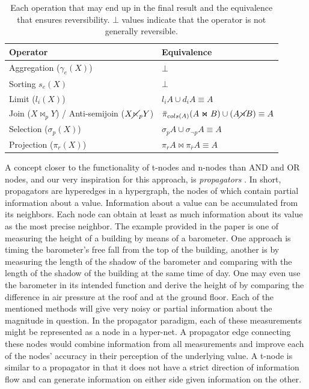 \begin{table}[H]
  \centering
  \begin{tabular}{ll}
    Operator & Equivalence\\
    \hline
    Aggregation (\(\gamma_e(X)\)) & \(\bot\) \\
    Sorting \(s_e(X)\) & \(\bot\) \\
    Limit (\(l_i(X)\)) & \(l_i A \cup d_i A \equiv A\) \\
    Join (\(X \Join_p Y\)) / Anti-semijoin (\(X \cancel\ltimes_p Y\)) & \( \bar{\pi}_{cols(A)}(A \Join B) \cup (A \cancel\rtimes B) \equiv A\)  \\
    Selection (\(\sigma_p(X)\)) & \(\sigma_p A \cup \sigma_{\neg p} A \equiv A\) \\
    Projection (\(\pi_r(X)\)) & \(\pi_r A \Join \pi_{\bar{r}} A \equiv A\) \\
  \end{tabular}
  \caption{\label{tab:reverse_corresp}Each operation that may end up
    in the final result and the equivalence that ensures
    reversibility. \(\bot\) values indicate that the operator is not
    generally reversible.}

\end{table}

A concept closer to the functionality of t-nodes and n-nodes than AND
and OR nodes, and our very inspiration for this approach, is
\emph{propagators} \cite{radulPropagationNetworksFlexible2009a}. In
short, propagators are hyperedges in a hypergraph, the nodes of which
contain partial information about a value. Information about a value
can be accumulated from its neighbors. Each node can obtain at least
as much information about its value as the most precise neighbor. The
example provided in the paper is one of measuring the height of a
building by means of a barometer. One approach is timing the
barometer's free fall from the top of the building, another is by
measuring the length of the shadow of the barometer and comparing with
the length of the shadow of the building at the same time of day. One
may even use the barometer in its intended function and derive the
height of by comparing the difference in air pressure at the roof and
at the ground floor. Each of the mentioned methods will give very
noisy or partial information about the magnitude in question. In the
propagator paradigm, each of these measurements might be represented
as a node in a hyper-net. A propagator edge connecting these nodes
would combine information from all measurements and improve each of
the nodes' accuracy in their perception of the underlying value. A
t-node is similar to a propagator in that it does not have a strict
direction of information flow and can generate information on either
side given information on the other.

